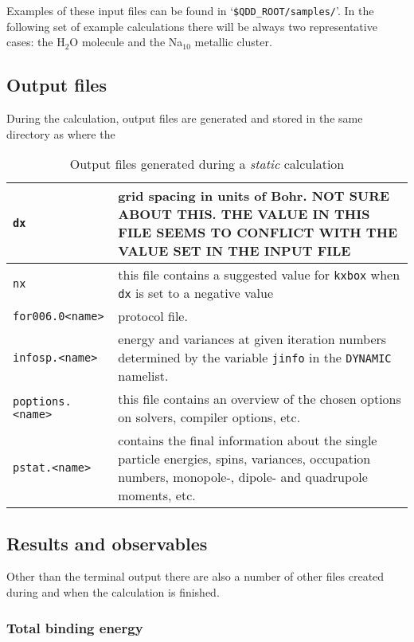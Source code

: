 \documentclass[11pt,a4paper]{article}
\begin{document}
		Examples of these input files can be found in `\texttt{\$QDD\_ROOT/samples/}'. In the following set of example calculations there will be always two representative cases: the H$_2$O molecule and the Na$_{10}$ metallic cluster.
			
		\subsection{Output files}
			During the calculation, output files are generated and stored in the same directory as where the 
			\begin{table}[h!]
				\caption{Output files generated during a \emph{static} calculation}\label{tab:static-output-files}
				\begin{tabular}{|p{3.5cm}|p{11.2cm}|}
					\hline
					\texttt{dx}& grid spacing in units of Bohr. \uppercase{not sure about this. the value in this file seems to conflict with the value set in the input file} \\
					\hline
					\texttt{nx}& this file contains a suggested value for \texttt{kxbox} when \texttt{dx} is set to a negative value\\
					\hline
					\texttt{for006.0<name>}& protocol file.\\
					\hline
					\texttt{infosp.<name>}& energy and variances at given iteration numbers determined by the variable \texttt{jinfo} in the \texttt{DYNAMIC} namelist.\\
					\hline
					\texttt{poptions.<name>}& this file contains an overview of the chosen options on solvers, compiler options, etc.\\
					\hline
					\texttt{pstat.<name>}& contains the final information about the single particle energies, spins, variances, occupation numbers, monopole-, dipole- and quadrupole moments, etc.\\
					\hline
				\end{tabular}
			\end{table}
		
		\subsection{Results and observables}
			Other than the terminal output there are also a number of other files created during and when the calculation is finished.
			\subsubsection{Total binding energy}
\end{document}
